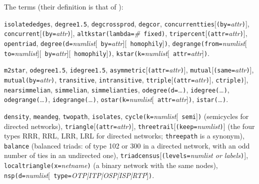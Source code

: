 The terms (their definition is that of \ergm{}):
\begin{description}[style=nextline,nosep]
  \item[Undirected networks only] \texttt{isolatededges}, \texttt{degree1.5}, \texttt{degcrossprod}, \texttt{degcor}, \texttt{concurrentties}[\texttt{(by=}\emph{attr}\texttt{)}], \texttt{concurrent}[\texttt{(by=}\emph{attr}\texttt{)}], \texttt{altkstar(lambda=}\emph{\#}\texttt{ fixed)}, \texttt{tripercent}[\texttt{(attr=}\allowbreak\emph{attr}\texttt{)}], \texttt{opentriad}, \texttt{degree(d=}\emph{numlist}[\texttt{ by=}\emph{attr}][\texttt{ homophily}]\texttt{)}, \texttt{degrange(from=}\emph{numlist}[\texttt{ to=}\emph{numlist}][\texttt{ by=}\emph{attr}][\texttt{ homophily}]\texttt{)}, \texttt{kstar(k=}\emph{numlist}[\texttt{ attr=}\emph{attr}]\texttt{)}.
  \item[Directed networks only] \texttt{m2star}, \texttt{odegree1.5}, \texttt{idegree1.5}, \texttt{asymmetric}[\texttt{(attr=}\allowbreak\emph{attr}\texttt{)}], \texttt{mutual}[\texttt{(same=}\allowbreak\emph{attr}\texttt{)}], \texttt{mutual(by=}\emph{attr}\texttt{)}, \texttt{transitive}, \texttt{intransitive}, \texttt{ttriple}[\texttt{(attr=}\allowbreak\emph{attr}\texttt{)}], \texttt{ctriple}\allowbreak[\texttt{(attr=}\allowbreak\emph{attr}\allowbreak[\texttt{ diff}]\texttt{)}], \texttt{nearsimmelian}, \texttt{simmelian}, \texttt{simmelianties}, \texttt{odegree(d=}\ldots\texttt{)}, \texttt{idegree(}\ldots\texttt{)}, \texttt{odegrange(}\ldots\texttt{)}, \texttt{idegrange(}\ldots\texttt{)}, \texttt{ostar(k=}\emph{numlist}[\texttt{ attr=}\emph{attr}]\texttt{)}, \texttt{istar(}\ldots\texttt{)}.
  \item[Both kinds of network] \texttt{density}, \texttt{meandeg}, \texttt{twopath}, \texttt{isolates}, \texttt{cycle(k=}\emph{numlist}[\texttt{ semi}]\texttt{)} (semicycles for directed networks), \texttt{triangle}[\texttt{(attr=}\allowbreak\emph{attr}\texttt{)}], \texttt{threetrail}[\texttt{(keep=}\emph{numlist}\texttt{)}] (the four types RRR, RRL, LRR, LRL for directed networks; \texttt{threepath} is a synonym), \texttt{balance} (balanced triads: of type 102 or 300 in a directed network, with an odd number of ties in an undirected one), \texttt{triadcensus}[\texttt{(levels=}\emph{numlist or labels}\texttt{)}], \texttt{localtriangle(x=}\emph{netname}\texttt{)} (a binary network with the same nodes), \texttt{nsp(d=}\emph{numlist}[\texttt{ type=}\emph{OTP|ITP|OSP|ISP|RTP}]\texttt{)}.
\end{description}

